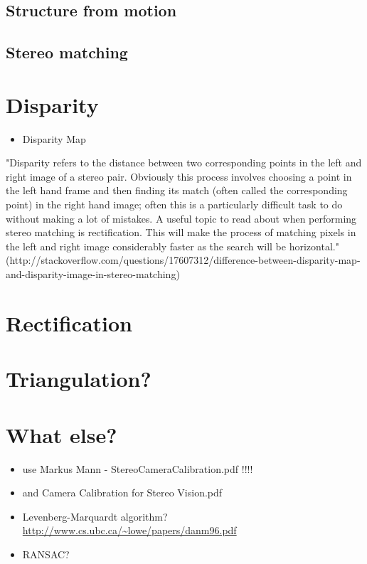 \subsection{Structure from motion}\label{ssec:SfM}
\subsection{Stereo matching}\label{ssec:stereoMatch}
 
\section{Disparity}

\begin{itemize}
\item Disparity Map
\end{itemize}

"Disparity refers to the distance between two corresponding points in the left and right image of a stereo pair. Obviously this process involves choosing a point in the left hand frame and then finding its match (often called the corresponding point) in the right hand image; often this is a particularly difficult task to do without making a lot of mistakes. A useful topic to read about when performing stereo matching is rectification. This will make the process of matching pixels in the left and right image considerably faster as the search will be horizontal."
(http://stackoverflow.com/questions/17607312/difference-between-disparity-map-and-disparity-image-in-stereo-matching)

\section{Rectification}
\section{Triangulation?}

\section{What else?}
\begin{itemize}
\item use Markus Mann - StereoCameraCalibration.pdf !!!!
\item and Camera Calibration for Stereo Vision.pdf
\item Levenberg-Marquardt algorithm? \url{http://www.cs.ubc.ca/~lowe/papers/danm96.pdf}
\item RANSAC?
\end{itemize}
